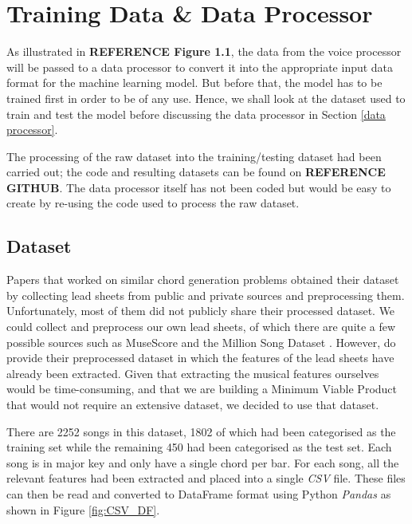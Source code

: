 
\chapter{Training Data \& Data Processor} %

\label{Chapter3} %

As illustrated in \textbf{REFERENCE Figure 1.1}, the data from the voice processor will be passed to a data processor to convert it into the appropriate input data format for the machine learning model. But before that, the model has to be trained first in order to be of any use. Hence, we shall look at the dataset used to train and test the model before discussing the data processor in Section \ref{data processor}.

The processing of the raw dataset into the training/testing dataset had been carried out; the code and resulting datasets can be found on \textbf{REFERENCE GITHUB}. The data processor itself has not been coded but would be easy to create by re-using the code used to process the raw dataset.

\section{Dataset}
Papers that worked on similar chord generation problems \cite{MySong} \cite{BLSTM} \cite{MLForChords} obtained their dataset by collecting lead sheets from public and private sources and preprocessing them. Unfortunately, most of them did not publicly share their processed dataset. We could collect and preprocess our own lead sheets, of which there are quite a few possible sources such as MuseScore and the Million Song Dataset \cite{Bertin-Mahieux2011}. However, \cite{BLSTM} do provide their preprocessed dataset in which the features of the lead sheets have already been extracted. Given that extracting the musical features ourselves would be time-consuming, and that we are building a Minimum Viable Product that would not require an extensive dataset, we decided to use that dataset.

There are 2252 songs in this dataset, 1802 of which had been categorised as the training set while the remaining 450 had been categorised as the test set. Each song is in major key and only have a single chord per bar. For each song, all the relevant features had been extracted and placed into a single \emph{CSV} file. These files can then be read and converted to DataFrame format using Python \emph{Pandas} as shown in Figure \ref{fig:CSV_DF}.

